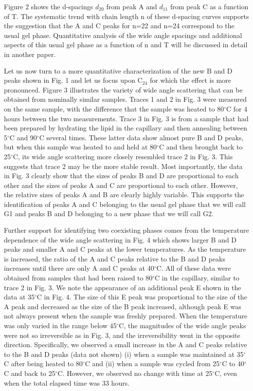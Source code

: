 Figure 2 shows the d-spacings $d_{20}$ from peak A and $d_{11}$ from peak
C as a function of T.
The systematic trend with chain length n of these d-spacing curves supports 
the suggestion that the A and
C peaks for n=22 and n=24 correspond to the usual gel phase.  
Quantitative analysis of the wide angle spacings and additional aspects 
of this usual gel phase as a function of n and T
will be discussed in detail in another paper.  

Let us now turn to a more quantitative characterization of the new
B and D peaks shown in Fig. 1 and let us focus upon C$_{24}$ for which the 
effect is more pronounced.  Figure 3 illustrates the variety of 
wide angle scattering that can be obtained from nominally similar samples.
Traces 1 and 2 in Fig. 3 were measured on the same sample,
with the difference that the sample was heated to 80$^{\circ}$C for
4 hours between the two measurements. Trace 3 in Fig. 3 is from a sample that 
had been prepared by hydrating the lipid in the capillary and then annealing 
between 5$^{\circ}$C and 90$^{\circ}$C several times. These latter data show 
almost pure B and D peaks, but when this sample was heated to and held at 
80$^{\circ}$C and then brought back to 25$^{\circ}$C, its wide angle 
scattering more closely resembled trace 2 in Fig. 3.  This suggests that 
trace 2 may be the more stable result.  Most importantly, the data in Fig. 3 
clearly show that the sizes of peaks B and D are proportional to each other 
and the sizes of peaks A and C are proportional to each other. However, the 
relative sizes of peaks A and B are clearly highly variable.
This supports the identification of peaks A and C belonging to the usual gel 
phase that we will call G1 and peaks B and D belonging to a new phase that 
we will call G2.

Further support for identifying two coexisting phases comes from the 
temperature dependence of the wide angle scattering in Fig. 4 which shows
larger B and D peaks and smaller A and C peaks at the lower temperatures.
As the temperature is increased, the ratio of the A and C peaks relative
to the B and D peaks increases until there are only A and C peaks at 
40$^{\circ}$C. All of these data were obtained from samples that had been 
raised to 80$^{\circ}$C in the capillary, similar to trace 2 in Fig. 3.  
We note the appearance of an additional peak E shown in the data at 
35$^{\circ}$C in Fig. 4.  The size of this E peak was proportional to the 
size of the A peak and decreased as the size of the B peak increased, although 
peak E was not always present when the sample was freshly prepared.
When the temperature was only varied in the range below 45$^{\circ}$C, the 
magnitudes of the wide angle peaks were not so irreversible as in Fig. 3, and 
the irreversibility went in the opposite direction.  Specifically, we observed 
a small increase in the A and C peaks relative to the B and D peaks 
(data not shown) (i) when a sample was maintained at 35$^{\circ}$C after being 
heated to 80$^{\circ}$C and (ii) when a sample was cycled from 25$^{\circ}$C to 
40$^{\circ}$C and back to 25$^{\circ}$C.  However, we observed no change with
time at 25$^{\circ}$C, even when the total elapsed time was 33 hours.

